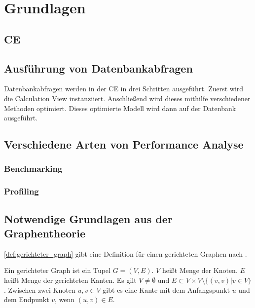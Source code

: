 \chapter{Grundlagen}

\section{\acl{CE}}

\section{Ausführung von Datenbankabfragen}
\label{sec:ausfuehrung_db_queries}
Datenbankabfragen werden in der  \ac{CE} in drei Schritten ausgeführt. Zuerst
wird die Calculation View instanziiert. Anschließend wird dieses mithilfe
verschiedener Methoden optimiert. Dieses optimierte Modell wird dann auf der
Datenbank ausgeführt.


\section{Verschiedene Arten von Performance Analyse}
\label{sec:arten_performance_analyse}
\subsection*{Benchmarking}
\subsection*{Profiling}


\section{Notwendige Grundlagen aus der Graphentheorie}
\label{sec:grundlagen_graphentheorie}

\autoref{def:gerichteter_graph} gibt eine Definition für einen gerichteten
Graphen nach \autocite[Vgl.][S.220]{AlgorithmenUndDatenstrukturen}.
\begin{definition}
    Ein gerichteter Graph ist ein Tupel $G=(V,E)$. $V$ heißt Menge der Knoten.
    $E$ heißt Menge der gerichteten Kanten. Es gilt $V\ne\emptyset$ und $E \subset V \times
    V \setminus \{(v,v) | v \in V\}$. Zwischen zwei Knoten $u,v \in V$ gibt es
    eine Kante mit dem Anfangspunkt $u$ und dem Endpunkt $v$, wenn $(u,v) \in E$.
    \label{def:gerichteter_graph}
\end{definition}

